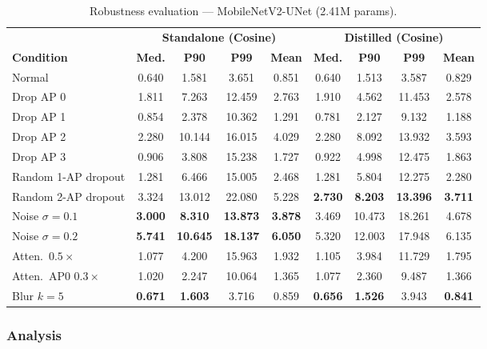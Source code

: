 \documentclass[11pt,a4paper]{article}
\newcommand{\best}[1]{\textcolor{bestcolor}{\textbf{#1}}}
\begin{document}
\begin{table}[H]
\centering
\caption{Robustness evaluation --- MobileNetV2-UNet (2.41M params).}
\label{tab:robust_unet}
\begin{tabular}{@{}lcccc|cccc@{}}
\toprule
 & \multicolumn{4}{c|}{\textbf{Standalone (Cosine)}} & \multicolumn{4}{c}{\textbf{Distilled (Cosine)}} \\
\textbf{Condition} & \textbf{Med.} & \textbf{P90} & \textbf{P99} & \textbf{Mean} & \textbf{Med.} & \textbf{P90} & \textbf{P99} & \textbf{Mean} \\
\midrule
Normal                 & 0.640 & 1.581 & 3.651  & 0.851 & 0.640 & 1.513 & 3.587  & 0.829 \\
\midrule
Drop AP 0              & 1.811 & 7.263 & 12.459 & 2.763 & 1.910 & 4.562 & 11.453 & 2.578 \\
Drop AP 1              & 0.854 & 2.378 & 10.362 & 1.291 & 0.781 & 2.127 & 9.132  & 1.188 \\
Drop AP 2              & 2.280 & 10.144& 16.015 & 4.029 & 2.280 & 8.092 & 13.932 & 3.593 \\
Drop AP 3              & 0.906 & 3.808 & 15.238 & 1.727 & 0.922 & 4.998 & 12.475 & 1.863 \\
Random 1-AP dropout    & 1.281 & 6.466 & 15.005 & 2.468 & 1.281 & 5.804 & 12.275 & 2.280 \\
Random 2-AP dropout    & 3.324 & 13.012& 22.080 & 5.228 & \best{2.730}& \best{8.203}& \best{13.396}& \best{3.711}\\
\midrule
Noise $\sigma\!=\!0.1$ & \best{3.000}& \best{8.310}& \best{13.873}& \best{3.878}& 3.469 & 10.473& 18.261 & 4.678 \\
Noise $\sigma\!=\!0.2$ & \best{5.741}& \best{10.645}& \best{18.137}& \best{6.050}& 5.320 & 12.003& 17.948 & 6.135 \\
\midrule
Atten.\ $0.5\times$    & 1.077 & 4.200 & 15.963 & 1.932 & 1.105 & 3.984 & 11.729 & 1.795 \\
Atten.\ AP0 $0.3\times$& 1.020 & 2.247 & 10.064 & 1.365 & 1.077 & 2.360 & 9.487  & 1.366 \\
Blur $k\!=\!5$         & \best{0.671}& \best{1.603}& 3.716 & 0.859 & \best{0.656}& \best{1.526}& 3.943 & \best{0.841} \\
\bottomrule
\end{tabular}
\end{table}

\subsubsection{Analysis}
\end{document}

